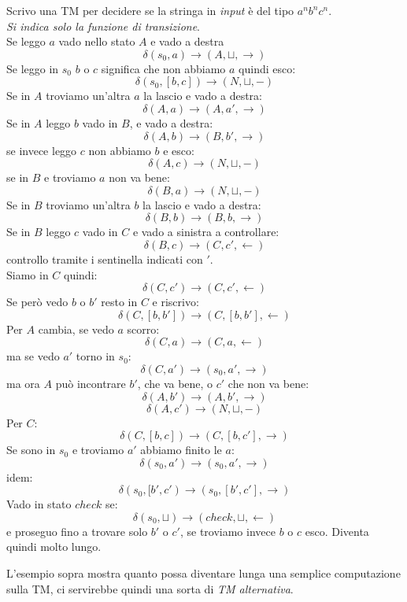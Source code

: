 \begin{esempio}
  Scrivo una TM per decidere se la stringa in \textit{input} è del tipo $a^nb^nc^n$.\\
  \textit{Si indica solo la funzione di transizione}.\\
  Se leggo $a$ vado nello stato $A$ e vado a destra
  \[\delta(s_0,a)\to (A,\sqcup, \rightarrow)\]
  Se leggo in $s_0$ $b$ o $c$ significa che non abbiamo $a$ quindi esco:
  \[\delta(s_0,[b,c])\to (N,\sqcup, -)\]
  Se in $A$  troviamo un'altra $a$ la lascio e vado a destra:
  \[\delta(A,a)\to (A,a', \rightarrow)\]
  Se in $A$ leggo $b$ vado in $B$, e vado a destra:
  \[\delta(A,b)\to (B,b', \rightarrow)\]
  se invece leggo $c$ non abbiamo $b$ e esco:
  \[\delta(A,c)\to (N,\sqcup, -)\]
  se in $B$ e  troviamo $a$ non va bene:
  \[\delta(B,a)\to (N,\sqcup, -)\]
  Se in $B$  troviamo un'altra $b$ la lascio e vado a destra:
  \[\delta(B,b)\to (B,b, \rightarrow)\]
  Se in $B$ leggo $c$ vado in $C$ e vado a sinistra a controllare:
  \[\delta(B,c)\to (C,c', \leftarrow)\]
  controllo tramite i sentinella indicati con $'$.\\
  Siamo in $C$ quindi:
  \[\delta(C,c')\to (C,c', \leftarrow)\]
  Se però vedo $b$ o $b'$ resto in $C$ e riscrivo:
  \[\delta(C,[b,b'])\to (C,[b,b'], \leftarrow)\]
  Per $A$ cambia, se vedo $a$ scorro:
  \[\delta(C,a)\to (C,a, \leftarrow)\]
  ma se vedo $a'$ torno in $s_0$:
  \[\delta(C,a')\to (s_0,a', \rightarrow)\]
  ma ora $A$ può incontrare $b'$, che va bene, o $c'$ che non va bene:
  \[\delta(A,b')\to (A,b', \rightarrow)\]
  \[\delta(A,c')\to (N,\sqcup, -)\]
  Per $C$:
  \[\delta(C,[b,c])\to (C,[b,c'], \rightarrow)\]
  Se sono in $s_0$ e  troviamo $a'$ abbiamo finito le $a$:
  \[\delta(s_0,a')\to (s_0,a' , \rightarrow)\]
  idem:
  \[\delta(s_0,[b',c')\to (s_0,[b',c'] , \rightarrow)\]
  Vado in stato $check$ se:
  \[\delta(s_0,\sqcup)\to(check,\sqcup, \leftarrow)\]
  e proseguo fino a trovare solo $b'$ o $c'$, se  troviamo invece $b$ o $c$ esco.
  Diventa quindi molto lungo.
\end{esempio}
L'esempio sopra mostra quanto possa diventare lunga una semplice computazione
sulla TM, ci servirebbe quindi una sorta di \textit{TM alternativa}.
